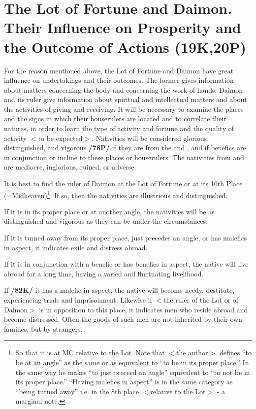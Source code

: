 \section{The Lot of Fortune and Daimon. Their Influence on Prosperity and the Outcome of Actions (19K,20P)}

For the reason mentioned above, the Lot of Fortune and Daimon have great influence on undertakings and their outcomes. The former gives information about matters concerning the body and concerning the work of hands. Daimon and its ruler give information about spiritual and intellectual matters and about the activities of giving and receiving. It will be necessary to examine the places and the signs in which their houserulers are located and to correlate their natures, in order to learn the type of activity and fortune and the quality of activity $<$to be expected$>$. Nativities will be considered glorious, distinguished, and vigorous \textbf{/78P/} if they are from the \Sun\xspace and \Moon, and if benefics are in conjunction or incline to these places or houserulers. The nativities from \Saturn\xspace and \Mars\xspace are mediocre, inglorious, ruined, or adverse. 

It is best to find the ruler of Daimon at the Lot of Fortune or at its 10th Place (=Midheaven)\footnote{So that it is at MC relative to the Lot. Note that $<$the author$>$ defines “to be at an angle” as the same or as equivalent to “to be in its proper place.” In the same way he makes “to just preceed an angle” equivalent to “to not be in its proper place.” “Having malefics in aspect” is in the same category as “being turned away” i.e. in the 8th place $<$relative to the Lot$>$ - a marginal note.}. If so, then the nativities are illustrious and
distinguished. 

If it is in its proper place or at another angle, the nativities will be as distinguished and vigorous as they can be under the circumstances. 

If it is turned away from its proper place, just precedes an angle, or has malefics in aspect, it indicates exile and distress abroad. 

If it is in conjunction with a benefic or has benefics in aspect, the native will live abroad for a long time, having a varied and fluctuating livelihood. 

If \textbf{/82K/} it has a malefic in aspect, the native will become needy, destitute, experiencing trials and imprisonment. Likewise if $<$the ruler of the Lot or of Daimon$>$ is in opposition to this place, it indicates men who reside abroad and become distressed. Often the goods of such men are not inherited by their own families, but by strangers.

\newpage